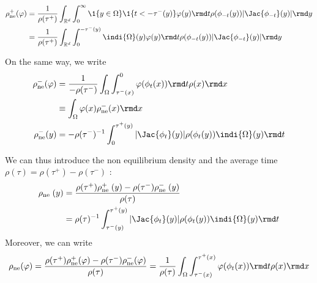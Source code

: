 \begin{align*}
\rho_{\mathrm{ne}}^{+}(\varphi)  &=\frac{1}{\rho(\tau^{+})} \int_{\mathbb{R}^{d}} \int_{0}^{\infty}\1\{y \in \Omega\}\1\{t< - \tau^-(y)\} \varphi(y) \rmd t \rho(\phi_{-t}(y))|\Jac{\phi_{-t}}(y)|  \rmd y \\
&= \frac{1}{\rho(\tau^{+})} \int_{\mathbb{R}^{d}} \int_{0}^{- \tau^{-}(y)}\indi{\Omega}(y)\varphi(y) \rmd t \rho(\phi_{-t}(y))|\Jac{\phi_{-t}}(y)|  \rmd y
\end{align*}

On the same way, we write
\begin{align*}
\rho_{\mathrm{ne}}^{-}(\varphi)  &=\frac{1}{-\rho(\tau^{-})} \int_{\Omega} \int_{\tau^{-}(x)}^{0} \varphi(\phi_t(x)) \rmd t \rho(x)  \rmd x \\
& \equiv \int_{\Omega} \varphi(x) \rho_{\mathrm{ne}}^{-}(x)  \rmd x \\
\rho_{\mathrm{ne}}^{-}(y) &=-\rho(\tau^{-})^{-1} \int_{0}^{\tau^{+}(y)}|\Jac{\phi_{t}}(y)| \rho(\phi_t(y))\indi{\Omega}(y)\rmd t
\end{align*}

We can thus introduce the non equilibrium density and the average time $\rho(\tau) = \rho(\tau^{+}) - \rho(\tau^{-})$ :
\begin{align}
\rho_{\text {ne }}(y) &=\frac{\rho(\tau^{+}) \rho_{\text {ne }}^{+}(y)-\rho(\tau^{-}) \rho_{\text {ne }}^{-}(y)}{\rho(\tau)} \\
&=\rho(\tau)^{-1} \int_{\tau^{-}(y)}^{\tau^{+}(y)}|\Jac{\phi_{t}}(y)| \rho(\phi_t(y))\indi{\Omega}(y)\rmd t
\end{align}
Moreover, we can write 
$$\rho_{\mathrm{ne}}(\varphi) = \frac{\rho(\tau^{+}) \rho_{\mathrm{ne}}^+(\varphi)-\rho(\tau^{-}) \rho_{\mathrm{ne}}^-(\varphi)}{\rho(\tau)} = \frac{1}{\rho(\tau)} \int_{\Omega} \int_{\tau^{-}(x)}^{\tau^{+}(x)} \varphi(\phi_t(x)) \rmd t \rho(x) \rmd x$$